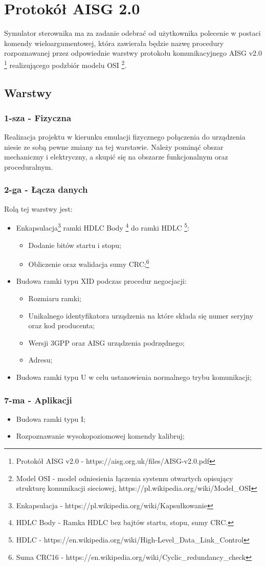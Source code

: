 \chapter{Protokół AISG 2.0}
	Symulator sterownika ma za zadanie odebrać od użytkownika polecenie w postaci komendy wieloargumentowej, 
	która zawierała będzie nazwę procedury rozpoznawanej przez odpowiednie warstwy protokołu komunikacyjnego AISG v2.0
	\footnote{\label{AISG} Protokół AISG v2.0 - https://aisg.org.uk/files/AISG-v2.0.pdf} realizującego podzbiór modelu OSI
	\footnote{\label{Model OSI} Model OSI - model odniesienia łączenia systemu otwartych opisujący strukturę komunikacji sieciowej, https://pl.wikipedia.org/wiki/Model\_OSI}.
	\section{Warstwy}
		\subsection{1-sza - Fizyczna}
		Realizacja projektu w kierunku emulacji fizycznego połączenia do urządzenia niesie ze sobą pewne zmiany na tej warstawie.\newline
		Należy pominąć obszar mechaniczny i elektryczny, a skupić się na obszarze funkcjonalnym oraz proceduralnym.
		\subsection{2-ga - Łącza danych}
		Rolą tej warstwy jest:
		\begin{itemize}
			\item Enkapsulacja\footnote{\label{Enkapsulacja} Enkapsulacja - https://pl.wikipedia.org/wiki/Kapsułkowanie} ramki HDLC Body
			\footnote{\label{HDLC Body} HDLC Body - Ramka HDLC bez bajtów startu, stopu, sumy CRC.} do ramki HDLC
			\footnote{\label{HDLC} HDLC - https://en.wikipedia.org/wiki/High-Level\_Data\_Link\_Control}:
			\begin{itemize}
				\item Dodanie bitów startu i stopu;
				\item Obliczenie oraz walidacja sumy CRC;\footnote{\label{CRC} Suma CRC16 - https://en.wikipedia.org/wiki/Cyclic\_redundancy\_check}
			\end{itemize}
			\item Budowa ramki typu XID podczas procedur negocjacji:
			\begin{itemize}
				\item Rozmiaru ramki;
				\item Unikalnego identyfikatora urządzenia na które składa się numer seryjny oraz kod producenta;
				\item Wersji 3GPP oraz AISG urządzenia podrzędnego;
				\item Adresu;
			\end{itemize}
			\item Budowa ramki typu U w celu ustanowienia normalnego trybu komunikacji;
		\end{itemize}
		\subsection{7-ma - Aplikacji}
			\begin{itemize}
				\item Budowa ramki typu I;
				\item Rozpoznawanie wysokopoziomowej komendy kalibruj;
			\end{itemize}